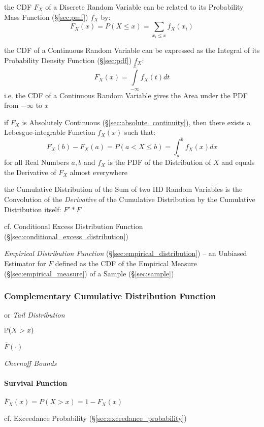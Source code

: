 the CDF $F_X$ of a Discrete Random Variable can be related to its Probability
Mass Function (\S\ref{sec:pmf}) $f_X$ by:
\[
  F_X(x) = P(X \leq x) = \sum_{x_i \leq x} f_X(x_i)
\]

the CDF of a Continuous Random Variable can be expressed as the Integral of its
Probability Density Function (\S\ref{sec:pdf}) $f_X$:
\[
  F_X(x) = \int\limits_{-\infty}^x f_X(t) dt
\]
i.e. the CDF of a Continuous Random Variable gives the Area under the PDF from
$-\infty$ to $x$

if $F_X$ is Absolutely Continuous (\S\ref{sec:absolute_continuity}), then there
exists a Lebesgue-integrable Function $f_X(x)$ such that:
\[
  F_X(b) - F_X(a) = P(a < X \leq b) = \int_a^b f_X(x) dx
\]
for all Real Numbers $a, b$ and $f_X$ is the PDF of the Distribution of $X$
and equals the Derivative of $F_X$ almost everywhere

the Cumulative Distribution of the Sum of two IID Random Variables is the
Convolution of the \emph{Derivative} of the Cumulative Distribution by the
Cumulative Distribution itself: $F' * F$

cf. Conditional Excess Distribution Function
(\S\ref{sec:conditional_excess_distribution})

\fist \emph{Empirical Distribution Function}
(\S\ref{sec:empirical_distribution}) -- an Unbiased Estimator for $F$ defined as
the CDF of the Empirical Measure (\S\ref{sec:empirical_measure}) of a Sample
(\S\ref{sec:sample})



\subsubsection{Complementary Cumulative Distribution Function}
\label{sec:tail_distribution}

or \emph{Tail Distribution}

$\mathbb{P}(X > x)$

$\bar{F}(\cdot)$

\emph{Chernoff Bounds}



\paragraph{Survival Function}\label{sec:survival_function}\hfill

$\bar{F}_X(x) = P(X > x) = 1 - F_X(x)$

cf. Exceedance Probability (\S\ref{sec:exceedance_probability})



